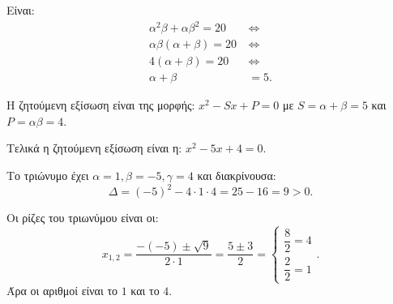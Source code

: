 
\begin{alist}
\item Είναι:
\begin{align*}
\alpha^2\beta + \alpha\beta^2 = 20 \ &\Leftrightarrow \\
\alpha\beta(\alpha + \beta) = 20 \ &\Leftrightarrow \\
4(\alpha + \beta) = 20 \ &\Leftrightarrow \\
\alpha + \beta &= 5.
\end{align*}

\item Η ζητούμενη εξίσωση είναι της μορφής:
$x^2 - Sx + P = 0$
με
$S = \alpha + \beta = 5$ και $P = \alpha\beta = 4$.

Τελικά η ζητούμενη εξίσωση είναι η:
$x^2 - 5x + 4 = 0$.

Το τριώνυμο έχει $\alpha = 1, \beta = -5, \gamma = 4$ και διακρίνουσα:
\[\Delta = (-5)^2 - 4 \cdot 1 \cdot 4 = 25 - 16 = 9 > 0.\]

Οι ρίζες του τριωνύμου είναι οι:
\[x_{1,2} = \dfrac{-(-5) \pm \sqrt{9}}{2 \cdot 1} = \dfrac{5 \pm 3}{2} = \begin{cases} \dfrac{8}{2} = 4 \\ \dfrac{2}{2} = 1 \end{cases}.\]
Άρα οι αριθμοί είναι το $1$ και το $4$.
\end{alist}

